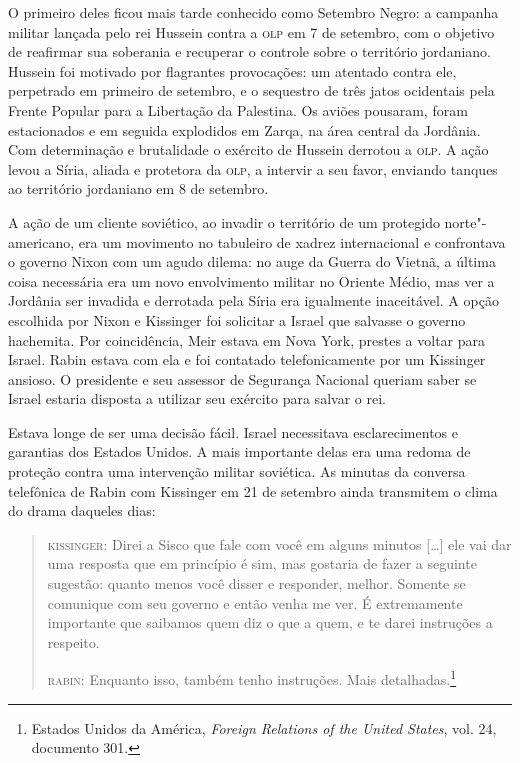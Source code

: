 O primeiro deles ficou mais tarde conhecido como Setembro Negro: a
campanha militar lançada pelo rei Hussein contra a \textsc{olp} em 7 de setembro,
com o objetivo de reafirmar sua soberania e recuperar o controle sobre o
território jordaniano. Hussein foi motivado por flagrantes provocações:
um atentado contra ele, perpetrado em primeiro de setembro, e o
sequestro de três jatos ocidentais pela Frente Popular para a Libertação
da Palestina. Os aviões pousaram, foram estacionados e em seguida
explodidos em Zarqa, na área central da Jordânia. Com determinação e
brutalidade o exército de Hussein derrotou a \textsc{olp}. A ação levou a Síria,
aliada e protetora da \textsc{olp}, a intervir a seu favor, enviando tanques ao
território jordaniano em 8 de setembro.

A ação de um cliente soviético, ao invadir o território de um protegido
norte"-americano, era um movimento no tabuleiro de xadrez internacional
e confrontava o governo Nixon com um agudo dilema: no auge da Guerra do
Vietnã, a última coisa necessária era um novo envolvimento militar no
Oriente Médio, mas ver a Jordânia ser invadida e derrotada pela Síria
era igualmente inaceitável. A opção escolhida por Nixon e Kissinger foi
solicitar a Israel que salvasse o governo hachemita. Por coincidência,
Meir estava em Nova York, prestes a voltar para Israel. Rabin estava
com ela e foi contatado telefonicamente por um Kissinger ansioso. O
presidente e seu assessor de Segurança Nacional queriam saber se Israel
estaria disposta a utilizar seu exército para salvar o rei.

Estava longe de ser uma decisão fácil. Israel necessitava
esclarecimentos e garantias dos Estados Unidos. A mais importante delas era uma
redoma de proteção contra uma intervenção militar soviética. As minutas
da conversa telefônica de Rabin com Kissinger em 21 de setembro ainda
transmitem o clima do drama daqueles dias:

\begin{quote}
\textsc{kissinger}: Direi a Sisco que fale com você em alguns minutos {[}\ldots{}{]} ele vai
dar uma resposta que em princípio é sim, mas gostaria de fazer a
seguinte sugestão: quanto menos você disser e responder, melhor. Somente
se comunique com seu governo e então venha me ver. É extremamente
importante que saibamos quem diz o que a quem, e te darei instruções a
respeito.

\textsc{rabin}: Enquanto isso, também tenho instruções. Mais
detalhadas.\footnote{Estados Unidos da América, \emph{Foreign Relations of the United States}, vol. 24, documento 301.}
\end{quote}

